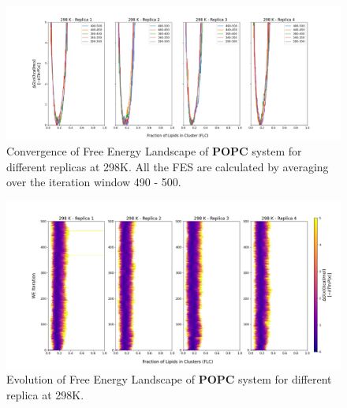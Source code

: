 \documentclass{biophys-new}
\begin{document}
\begin{figure}[hbt!]
\centering
\includegraphics[width=1.1\linewidth]{all_plots/ClusterLipids2Total/DPPC_POPC_CHOL/298K/Convergence_POPC_298_ClusterLipids2Total.png}
\caption{Convergence of Free Energy Landscape of \textbf{POPC} system for different replicas at 298K. All the FES are calculated by averaging over the iteration window 490 - 500.}
\label{fig:view}

\end{figure}

\begin{figure}[hbt!]
\centering
\includegraphics[width=1.1\linewidth]{all_plots/ClusterLipids2Total/DPPC_POPC_CHOL/298K/Evolution_POPC_298_ClusterLipids2Total.png}
\caption{Evolution of Free Energy Landscape of \textbf{POPC} system for different replica at 298K.}
\label{fig:view}

\end{figure}
\end{document}
